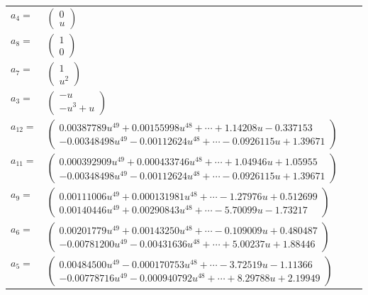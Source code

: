 \documentclass[1p]{elsarticle_modified}
\theoremstyle{definition}
\begin{document}
\begin{tabular}{m{7pt} m{180pt} m{7pt} m{180pt} }
\flushright $a_{4}=$&$\begin{pmatrix}0\\u\end{pmatrix}$ \\
\flushright $a_{8}=$&$\begin{pmatrix}1\\0\end{pmatrix}$ \\
\flushright $a_{7}=$&$\begin{pmatrix}1\\u^2\end{pmatrix}$ \\
\flushright $a_{3}=$&$\begin{pmatrix}- u\\- u^3+u\end{pmatrix}$ \\
\flushright $a_{12}=$&$\begin{pmatrix}0.00387789 u^{49}+0.00155998 u^{48}+\cdots+1.14208 u-0.337153\\-0.00348498 u^{49}-0.00112624 u^{48}+\cdots-0.0926115 u+1.39671\end{pmatrix}$ \\
\flushright $a_{11}=$&$\begin{pmatrix}0.000392909 u^{49}+0.000433746 u^{48}+\cdots+1.04946 u+1.05955\\-0.00348498 u^{49}-0.00112624 u^{48}+\cdots-0.0926115 u+1.39671\end{pmatrix}$ \\
\flushright $a_{9}=$&$\begin{pmatrix}0.00111006 u^{49}+0.000131981 u^{48}+\cdots-1.27976 u+0.512699\\0.00140446 u^{49}+0.00290843 u^{48}+\cdots-5.70099 u-1.73217\end{pmatrix}$ \\
\flushright $a_{6}=$&$\begin{pmatrix}0.00201779 u^{49}+0.00143250 u^{48}+\cdots-0.109009 u+0.480487\\-0.00781200 u^{49}-0.00431636 u^{48}+\cdots+5.00237 u+1.88446\end{pmatrix}$ \\
\flushright $a_{5}=$&$\begin{pmatrix}0.00484500 u^{49}-0.000170753 u^{48}+\cdots-3.72519 u-1.11366\\-0.00778716 u^{49}-0.000940792 u^{48}+\cdots+8.29788 u+2.19949\end{pmatrix}$ \\

\end{tabular}
\end{document}
